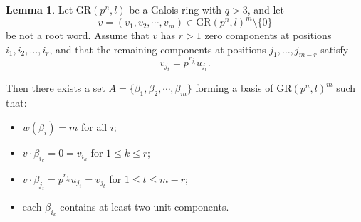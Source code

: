 \documentclass[10pt]{article}
\theoremstyle{definition}
\newtheorem{lemma}[lem]{Lemma}
\begin{document}
\begin{lemma}\label{Lemma 23}
Let $\mathrm{GR}(p^n,l)$ be a Galois ring with $q>3$, and let
\[
v=(v_1,v_2,\cdots,v_m)\in \mathrm{GR}(p^n,l)^m\setminus\{0\}
\]
be not a root word.
Assume that $v$ has $r>1$ zero components at positions
$i_1,i_2,\dots,i_r$,
and that the remaining components at positions
$j_1,\dots,j_{m-r}$ satisfy
\[
v_{j_t}=p^{r_{j_t}}u_{j_t}.
\]

Then there exists a set
$A=\{\beta_1,\beta_2,\cdots,\beta_m\}$
forming a basis of $\mathrm{GR}(p^n,l)^m$ such that:

\begin{itemize}
\item $w(\beta_i)=m$ for all $i$;
\item $v\cdot \beta_{i_k}=0=v_{i_k}$ for $1\le k\le r$;
\item $v\cdot \beta_{j_t}=p^{r_{j_t}}u_{j_t}=v_{j_t}$ for $1\le t\le m-r$;
\item each $\beta_{i_k}$ contains at least two unit components.
\end{itemize}
\end{lemma}
\end{document}
